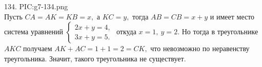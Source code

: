 134. {{PIC:g7-134.png}}\\
Пусть $CA=AK=KB=x,$ а $KC=y,$ тогда $AB=CB=x+y$ и имеет место система уравнений $\begin{cases} 2x+y=4,\\ 3x+y=5.\end{cases}$ откуда $x=1,\ y=2.$ Но тогда в треугольнике $AKC$ получаем $AK+AC=1+1=2=CK,$ что невозможно по неравенству треугольника. Значит, такого треугольника не существует.\newpage\noindent

